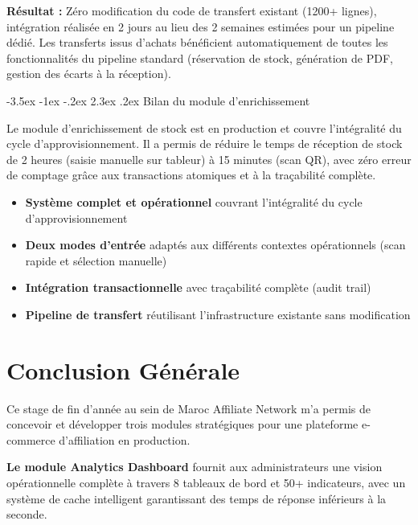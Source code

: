 \documentclass[12pt,a4paper,openany]{report}
\makeatletter
\renewcommand\section{\@startsection{section}{1}{\z@}%
  {-3.5ex \@plus -1ex \@minus -.2ex}%
  {2.3ex \@plus.2ex}%
  {\needspace{10\baselineskip}\normalfont\Large\bfseries\color{primary}}}
\makeatother
\begin{document}
\textbf{Résultat :} Zéro modification du code de transfert existant (1200+ lignes), intégration réalisée en 2 jours au lieu des 2 semaines estimées pour un pipeline dédié. Les transferts issus d'achats bénéficient automatiquement de toutes les fonctionnalités du pipeline standard (réservation de stock, génération de PDF, gestion des écarts à la réception).

\section{Bilan du module d'enrichissement}

Le module d'enrichissement de stock est en production et couvre l'intégralité du cycle d'approvisionnement. Il a permis de réduire le temps de réception de stock de 2 heures (saisie manuelle sur tableur) à 15 minutes (scan QR), avec zéro erreur de comptage grâce aux transactions atomiques et à la traçabilité complète.

\begin{itemize}
  \item \textbf{Système complet et opérationnel} couvrant l'intégralité du cycle d'approvisionnement
  \item \textbf{Deux modes d'entrée} adaptés aux différents contextes opérationnels (scan rapide et sélection manuelle)
  \item \textbf{Intégration transactionnelle} avec traçabilité complète (audit trail)
  \item \textbf{Pipeline de transfert} réutilisant l'infrastructure existante sans modification
\end{itemize}

\chapter*{Conclusion Générale}

Ce stage de fin d'année au sein de Maroc Affiliate Network m'a permis de concevoir et développer trois modules stratégiques pour une plateforme e-commerce d'affiliation en production.

\textbf{Le module Analytics Dashboard} fournit aux administrateurs une vision opérationnelle complète à travers 8 tableaux de bord et 50+ indicateurs, avec un système de cache intelligent garantissant des temps de réponse inférieurs à la seconde.
\end{document}
